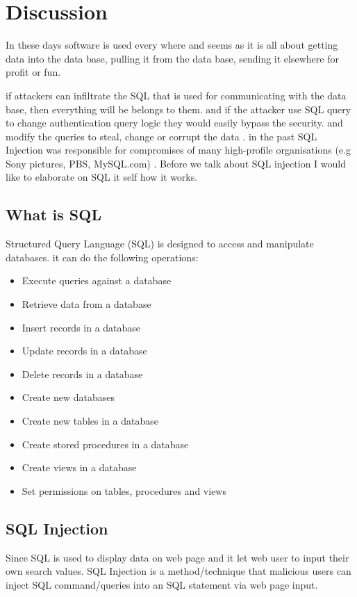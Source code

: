 \section{Discussion}

In these days software is used every where and seems as it is all about getting data into the data base, pulling it from the data base, sending it elsewhere for profit or fun.

if attackers can infiltrate the SQL that is used for communicating with the data base, then everything will be belongs to them. and if the attacker use SQL query to change authentication query logic they would easily bypass the security. and modify the queries to steal, change or corrupt the data .
in the past SQL Injection was responsible for compromises of many high-profile  organisations (e.g Sony pictures, PBS, MySQL.com) . 
\cite{discussion}
Before we talk about SQL injection I would like to elaborate on SQL it self how it works.

\subsection{What is SQL}
Structured Query Language (SQL) is designed to access and manipulate databases.
it can do the following operations:
\begin{itemize}
\item Execute queries against a database
\item Retrieve data from a database
\item Insert records in a database
\item Update records in a database
\item Delete records in a database
\item Create new databases
\item Create new tables in a database
\item Create stored procedures in a database
\item Create views in a database
\item Set permissions on tables, procedures and views
\end{itemize}
\cite{SQL}


\subsection{ SQL Injection }
Since SQL is used to display data on web page and it let web user to input their own search values.
SQL Injection is a method/technique that malicious users can inject SQL command/queries into an SQL statement via web page input.
\cite{SQLInjection}

